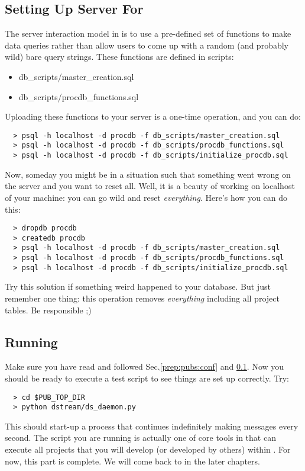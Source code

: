 \subsection{Setting Up {\psql} Server For {\pubs}}
\label{prep:pubs:sql}
The {\psql} server interaction model in {\pubs} is to use a pre-defined set of functions 
to make data queries rather than allow users to come up with a random (and probably wild)
bare query strings. These functions are defined in {\sql} scripts:
\begin{itemize}
  \item db\_scripts/master\_creation.sql
  \item db\_scripts/procdb\_functions.sql
\end{itemize}
Uploading these functions to your server is a one-time operation, and you can do:
\begin{lstlisting}
  > psql -h localhost -d procdb -f db_scripts/master_creation.sql
  > psql -h localhost -d procdb -f db_scripts/procdb_functions.sql
  > psql -h localhost -d procdb -f db_scripts/initialize_procdb.sql
\end{lstlisting}

Now, someday you might be in a situation such that something went wrong on the server
and you want to reset all. Well, it is a beauty of working on localhost of your machine:
you can go wild and reset {\it everything}. Here's how you can do this:
\begin{lstlisting}
  > dropdb procdb
  > createdb procdb
  > psql -h localhost -d procdb -f db_scripts/master_creation.sql
  > psql -h localhost -d procdb -f db_scripts/procdb_functions.sql
  > psql -h localhost -d procdb -f db_scripts/initialize_procdb.sql
\end{lstlisting}

Try this solution if something weird happened to your {\procdb} database.
But just remember one thing: this operation removes {\it everything} including 
all project tables. Be responsible ;)

\subsection{Running {\pubs}}
\label{prep:pubs:daemon}
Make sure you have read and followed Sec.\ref{prep:pubs:conf} and \ref{prep:pubs:sql}.
Now you should be ready to execute a test script to see things are set up correctly.
Try:
\begin{lstlisting}
  > cd $PUB_TOP_DIR
  > python dstream/ds_daemon.py
\end{lstlisting}
This should start-up a process that continues indefinitely making {\stdout} messages
every second. The script you are running is actually one of core tools in {\pubs} that
can execute all projects that you will develop (or developed by others) within {\pubs}.
For now, this part is complete. We will come back to in the later chapters.
